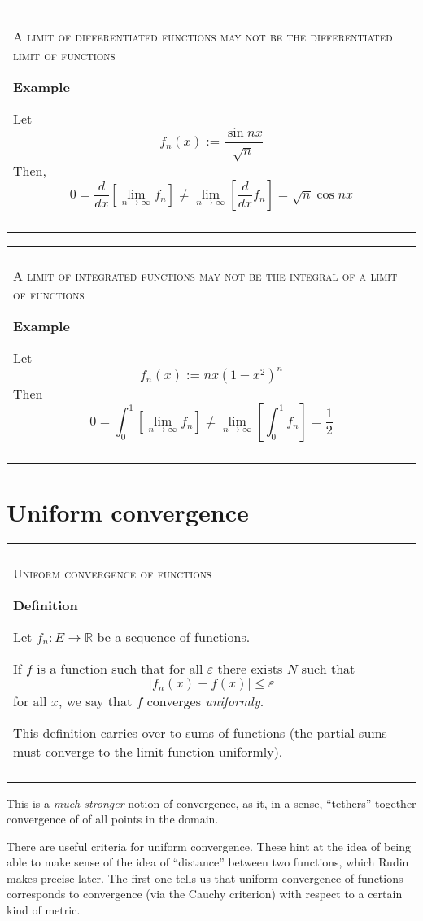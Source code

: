 \documentclass{article}
\newenvironment{myboxed}{\bigskip\noindent\begin{tabular}{|p{.975\linewidth}|}\hline \\}{\\\\\hline\end{tabular}\bigskip}
\begin{document}
\begin{myboxed}
    \textsc{A limit of differentiated functions may not be the differentiated limit of functions}

    \textbf{Example}

    Let 
    \[f_n(x) := \frac{\sin nx}{\sqrt{n}}\]
    Then,
    \[0 = \frac{d}{dx}\left[\lim_{n \to \infty} f_n \right]\neq \lim_{n \to \infty} \left[\frac{d}{dx} f_n\right] = \sqrt{n}\cos nx\]
\end{myboxed}

\begin{myboxed}
    \textsc{A limit of integrated functions may not be the integral of a limit of functions}

    \textbf{Example}

    Let 
    \[f_n(x) := n x(1-x^2)^n\]
    Then
    \[0 = \int_0^1 \left[\lim_{n \to \infty} f_n \right] \neq \lim_{n \to \infty} \left[\int_0^1 f_n \right] = \frac{1}{2} \]
        
\end{myboxed}

\newpage
\section{Uniform convergence}

\begin{myboxed}
    \textsc{Uniform convergence of functions}

    \textbf{Definition}

    Let $f_n: E \rightarrow \mathbb{R}$ be a sequence of functions. 

    If $f$ is a function such that for all $\varepsilon$ there exists $N$ such that
    \[|f_n(x) - f(x)| \leq \varepsilon\]
    for all $x$, we say that $f$ converges \textit{uniformly}.

    This definition carries over to sums of functions (the partial sums must converge to the limit function uniformly).
\end{myboxed}

This is a \textit{much stronger} notion of convergence, as it, in a sense, ``tethers'' together convergence of of all points in the domain. 

There are useful criteria for uniform convergence. These hint at the idea of being able to make sense of the idea of ``distance'' between two functions, which Rudin makes precise later. The first one tells us that uniform convergence of functions corresponds to convergence (via the Cauchy criterion) with respect to a certain kind of metric. 
\end{document}
